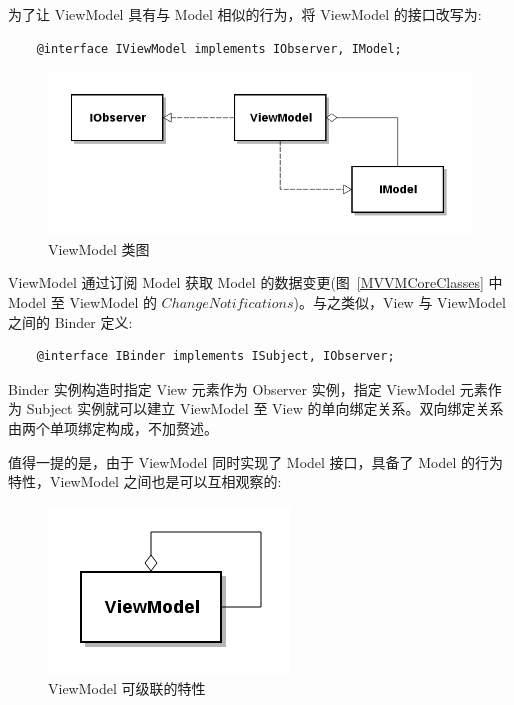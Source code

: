 为了让 ViewModel 具有与 Model 相似的行为，将 ViewModel 的接口改写为:

\begin{verbatim}
    @interface IViewModel implements IObserver, IModel;
\end{verbatim}

\begin{figure}[!h]
  \begin{center}
    \includegraphics[scale=0.5]{figures/diagram-viewmodel.png}
    \caption{ViewModel 类图\label{ViewModelClass}}
  \end{center}
\end{figure}

ViewModel 通过订阅 Model 获取 Model 的数据变更(图~\ref{MVVMCoreClasses} 中 Model 至 ViewModel 的 $Change Notifications$)。与之类似，View 与 ViewModel 之间的 Binder 定义:

\begin{verbatim}
    @interface IBinder implements ISubject, IObserver;
\end{verbatim}

Binder 实例构造时指定 View 元素作为 Observer 实例，指定 ViewModel 元素作为 Subject 实例就可以建立 ViewModel 至 View 的单向绑定关系。双向绑定关系由两个单项绑定构成，不加赘述。

值得一提的是，由于 ViewModel 同时实现了 Model 接口，具备了 Model 的行为特性，ViewModel 之间也是可以互相观察的:

\begin{figure}[!h]
  \begin{center}
    \includegraphics[scale=0.5]{figures/diagram-viewmodel-cascading.png}
    \caption{ViewModel 可级联的特性\label{ViewModelCascading}}
  \end{center}
\end{figure}

